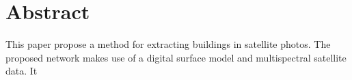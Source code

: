 \chapter*{Abstract}
%


This paper propose a method for extracting buildings in satellite photos. 
The proposed network makes use of a digital surface model and multispectral satellite data. It 
